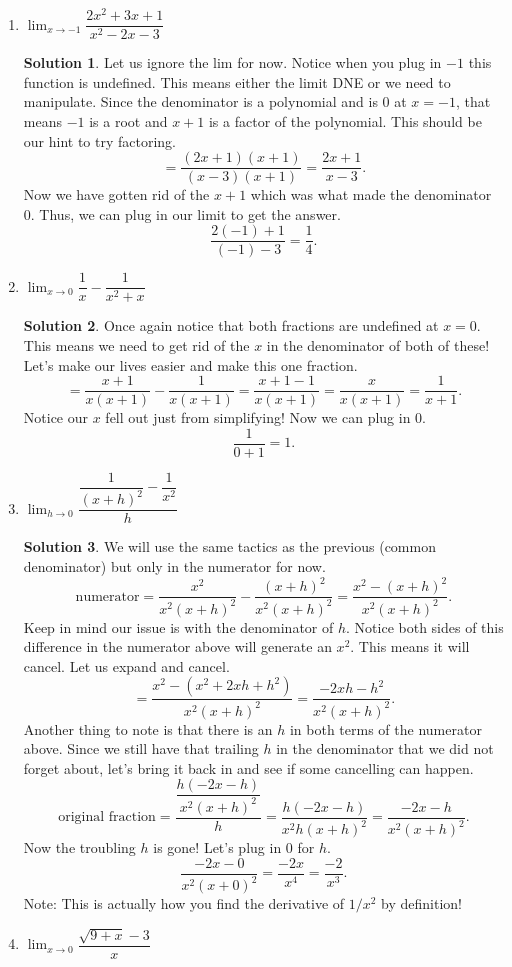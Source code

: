 \documentclass[10pt]{article}
\newcommand{\ds}{\displaystyle}
\theoremstyle{Theorem}
\theoremstyle{definition}
\newtheorem*{solution}{Solution}
\theoremstyle{remark}
\theoremstyle{custom}
\begin{document}
\begin{enumerate}[1.]
\item $\ds\lim_{x\rightarrow-1}\dfrac{2x^2+3x+1}{x^2-2x-3}$

\begin{solution}
Let us ignore the lim for now. Notice when you plug in $-1$ this function is undefined.  This means either the limit DNE or we need to manipulate.  Since the denominator is a polynomial and is 0 at $x=-1$, that means $-1$ is a root and $x+1$ is a factor of the polynomial. This should be our hint to try factoring.
$$=\dfrac{(2x+1)(x+1)}{(x-3)(x+1)}=\dfrac{2x+1}{x-3}.$$
Now we have gotten rid of the $x+1$ which was what made the denominator 0. Thus, we can plug in our limit to get the answer.
$$\dfrac{2(-1)+1}{(-1)-3}=\dfrac{1}{4}.$$
\end{solution}
\item $\ds\lim_{x\rightarrow 0} \dfrac{1}{x}-\dfrac{1}{x^2+x}$

\begin{solution}
Once again notice that both fractions are undefined at $x=0$.  This means we need to get rid of the $x$ in the denominator of both of these! Let's make our lives easier and make this one fraction.
$$=\dfrac{x+1}{x(x+1)}-\dfrac{1}{x(x+1)}=\dfrac{x+1-1}{x(x+1)}=\dfrac{x}{x(x+1)}=\dfrac{1}{x+1}.$$
Notice our $x$ fell out just from simplifying! Now we can plug in 0.
$$\dfrac{1}{0+1}=1.$$
\end{solution}
\newpage
\item $\ds\lim_{h\rightarrow 0} \dfrac{\dfrac{1}{(x+h)^2}-\dfrac{1}{x^2}}{h}$

\begin{solution}
We will use the same tactics as the previous (common denominator) but only in the numerator for now.
$$\text{numerator}=\dfrac{x^2}{x^2(x+h)^2}-\dfrac{(x+h)^2}{x^2(x+h)^2}=\dfrac{x^2-(x+h)^2}{x^2(x+h)^2}.$$
Keep in mind our issue is with the denominator of $h$. Notice both sides of this difference in the numerator above will generate an $x^2$. This means it will cancel. Let us expand and cancel.  
$$=\dfrac{x^2-(x^2+2xh+h^2)}{x^2(x+h)^2}=\dfrac{-2xh-h^2}{x^2(x+h)^2}.$$
Another thing to note is that there is an $h$ in both terms of the numerator above. Since we still have that trailing $h$ in the denominator that we did not forget about, let's bring it back in and see if some cancelling can happen.
$$\text{original fraction}=\dfrac{\dfrac{h(-2x-h)}{x^2(x+h)^2}}{h}=\dfrac{h(-2x-h)}{x^2h(x+h)^2}=\dfrac{-2x-h}{x^2(x+h)^2}.$$
Now the troubling $h$ is gone! Let's plug in 0 for $h$.
$$\dfrac{-2x-0}{x^2(x+0)^2}=\dfrac{-2x}{x^4}=\dfrac{-2}{x^3}.$$
Note: This is actually how you find the derivative of $1/x^2$ by definition!
\end{solution}
\item $\ds\lim_{x\rightarrow 0} \dfrac{\sqrt{9+x}-3}{x}$


\end{enumerate}
\end{document}
